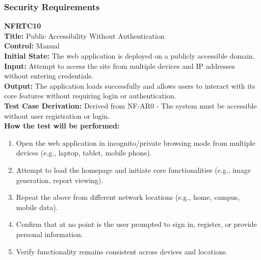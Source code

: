 \documentclass[12pt, titlepage]{article}
\begin{document}
\vspace{1em}
\subsubsection{Security Requirements}

\textbf{NFRTC10}\\
\textbf{Title:} Public Accessibility Without Authentication\\
\textbf{Control:} Manual\\
\textbf{Initial State:} The web application is deployed on a publicly accessible domain.\\
\textbf{Input:} Attempt to access the site from multiple devices and IP addresses without entering credentials.\\
\textbf{Output:} The application loads successfully and allows users to interact with its core features without requiring login or authentication.\\
\textbf{Test Case Derivation:} Derived from NF-AR0 - The system must be accessible without user registration or login.\\
\textbf{How the test will be performed:}
\begin{enumerate}
  \item Open the web application in incognito/private browsing mode from multiple devices (e.g., laptop, tablet, mobile phone).
  \item Attempt to load the homepage and initiate core functionalities (e.g., image generation, report viewing).
  \item Repeat the above from different network locations (e.g., home, campus, mobile data).
  \item Confirm that at no point is the user prompted to sign in, register, or provide personal information.
  \item Verify functionality remains consistent across devices and locations.
\end{enumerate}
\vspace{1em}
\end{document}
